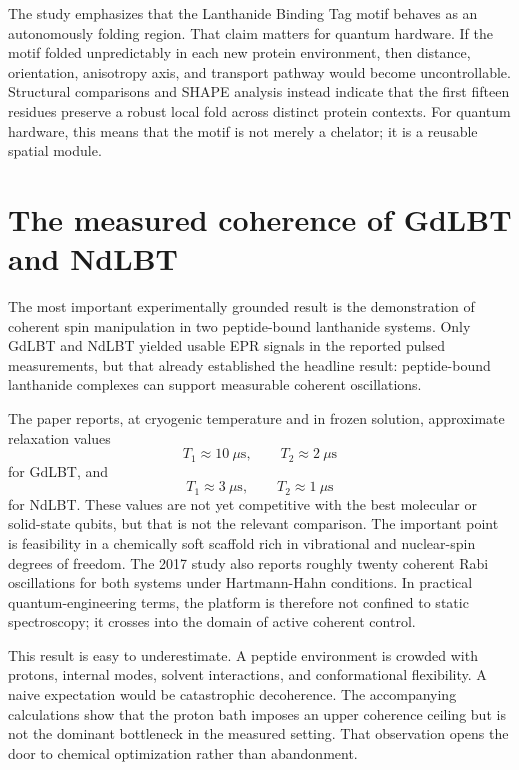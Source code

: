 \documentclass[11pt]{report}
\newcommand{\lbt}{Lanthanide Binding Tag}
\theoremstyle{definition}
\begin{document}
The study emphasizes that the \lbt{} motif behaves as an autonomously folding region. That claim matters for quantum hardware. If the motif folded unpredictably in each new protein environment, then distance, orientation, anisotropy axis, and transport pathway would become uncontrollable. Structural comparisons and SHAPE analysis instead indicate that the first fifteen residues preserve a robust local fold across distinct protein contexts. For quantum hardware, this means that the motif is not merely a chelator; it is a reusable spatial module.

\section{The measured coherence of GdLBT and NdLBT}
The most important experimentally grounded result is the demonstration of coherent spin manipulation in two peptide-bound lanthanide systems. Only GdLBT and NdLBT yielded usable EPR signals in the reported pulsed measurements, but that already established the headline result: peptide-bound lanthanide complexes can support measurable coherent oscillations.

The paper reports, at cryogenic temperature and in frozen solution, approximate relaxation values
\[
T_1 \approx 10~\mu\text{s}, \qquad T_2 \approx 2~\mu\text{s}
\]
for GdLBT, and
\[
T_1 \approx 3~\mu\text{s}, \qquad T_2 \approx 1~\mu\text{s}
\]
for NdLBT. These values are not yet competitive with the best molecular or solid-state qubits, but that is not the relevant comparison. The important point is feasibility in a chemically soft scaffold rich in vibrational and nuclear-spin degrees of freedom. The 2017 study also reports roughly twenty coherent Rabi oscillations for both systems under Hartmann-Hahn conditions. In practical quantum-engineering terms, the platform is therefore not confined to static spectroscopy; it crosses into the domain of active coherent control.

This result is easy to underestimate. A peptide environment is crowded with protons, internal modes, solvent interactions, and conformational flexibility. A naive expectation would be catastrophic decoherence. The accompanying calculations show that the proton bath imposes an upper coherence ceiling but is not the dominant bottleneck in the measured setting. That observation opens the door to chemical optimization rather than abandonment.
\end{document}
